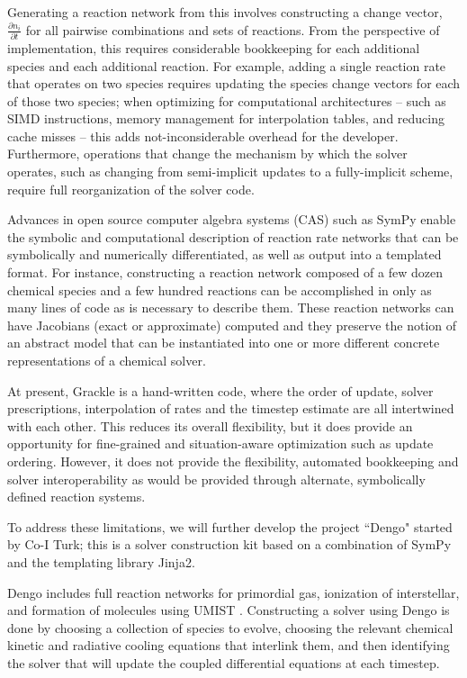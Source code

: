 Generating a reaction network from this involves constructing a change vector,
$\frac{\partial n_i}{\partial t}$ for all pairwise combinations and sets of
reactions.  From the perspective of implementation, this requires considerable
bookkeeping for each additional species and each additional reaction.  For
example, adding a single reaction rate that operates on two species requires
updating the species change vectors for each of those two species; when
optimizing for computational architectures -- such as SIMD instructions, memory
management for interpolation tables, and reducing cache misses -- this adds
not-inconsiderable overhead for the developer.  Furthermore, operations that
change the mechanism by which the solver operates, such as changing from
semi-implicit updates to a fully-implicit scheme, require full reorganization
of the solver code.  

Advances in open source computer algebra systems (CAS) such as SymPy
\citep{10.7717/peerj-cs.103} enable the symbolic and computational description
of reaction rate networks that can be symbolically and numerically
differentiated, as well as output into a templated format.  For instance,
constructing a reaction network composed of a few dozen chemical species and a
few hundred reactions can be accomplished in only as many lines of code as is
necessary to describe them.  These reaction networks can have Jacobians (exact
or approximate) computed and they preserve the notion of an abstract model that
can be instantiated into one or more different concrete representations of a
chemical solver.

At present, Grackle is a hand-written code, where the order of update, solver
prescriptions, interpolation of rates and the timestep estimate are all
intertwined with each other.  This reduces its overall flexibility, but it does
provide an opportunity for fine-grained and situation-aware optimization such
as update ordering.  However, it does not provide the flexibility, automated
bookkeeping and solver interoperability as would be provided through alternate,
symbolically defined reaction systems.

To address these limitations, we will further develop the project ``Dengo"
started by Co-I Turk; this is a solver construction kit based on a combination
of SymPy and the templating library Jinja2.  


Dengo includes full reaction networks for primordial gas, ionization of
interstellar, and formation of molecules using UMIST
\citep{2013A&A...550A..36M}.  Constructing a solver using Dengo is done by
choosing a collection of species to evolve, choosing the relevant chemical
kinetic and radiative cooling equations that interlink them, and then
identifying the solver that will update the coupled differential equations at
each timestep.


